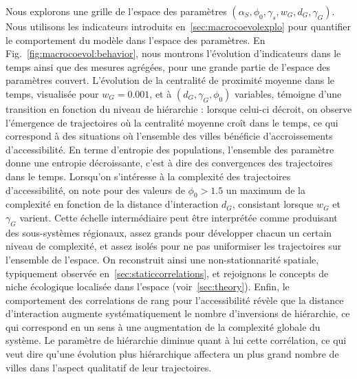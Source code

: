 Nous explorons une grille de l'espace des paramètres $(\alpha_S,\phi_0,\gamma_s,w_G,d_G,\gamma_G)$. Nous utilisons les indicateurs introduits en~\ref{sec:macrocoevolexplo} pour quantifier le comportement du modèle dans l'espace des paramètres. En Fig.~\ref{fig:macrocoevol:behavior}, nous montrons l'évolution d'indicateurs dans le temps ainsi que des mesures agrégées, pour une grande partie de l'espace des paramètres couvert. L'évolution de la centralité de proximité moyenne dans le temps, visualisée pour $w_G = 0.001$, et à $(d_G,\gamma_G,\phi_0)$ variables, témoigne d'une transition en fonction du niveau de hiérarchie : lorsque celui-ci décroit, on observe l'émergence de trajectoires où la centralité moyenne croît dans le temps, ce qui correspond à des situations où l'ensemble des villes bénéficie d'accroissements d'accessibilité. En terme d'entropie des populations, l'ensemble des paramètre donne une entropie décroissante, c'est à dire des convergences des trajectoires dans le temps. Lorsqu'on s'intéresse à la complexité des trajectoires d'accessibilité, on note pour des valeurs de $\phi_0 > 1.5$ un maximum de la complexité en fonction de la distance d'interaction $d_G$, consistant lorsque $w_G$ et $\gamma_G$ varient. Cette échelle intermédiaire peut être interprétée comme produisant des sous-systèmes régionaux, assez grands pour développer chacun un certain niveau de complexité, et assez isolés pour ne pas uniformiser les trajectoires sur l'ensemble de l'espace. On reconstruit ainsi une non-stationnarité spatiale, typiquement observée en~\ref{sec:staticcorrelations}, et rejoignons le concepts de niche écologique localisée dans l'espace (voir~\ref{sec:theory}). Enfin, le comportement des correlations de rang pour l'accessibilité révèle que la distance d'interaction augmente systématiquement le nombre d'inversions de hiérarchie, ce qui correspond en un sens à une augmentation de la complexité globale du système. Le paramètre de hiérarchie diminue quant à lui cette corrélation, ce qui veut dire qu'une évolution plus hiérarchique affectera un plus grand nombre de villes dans l'aspect qualitatif de leur trajectoires.



